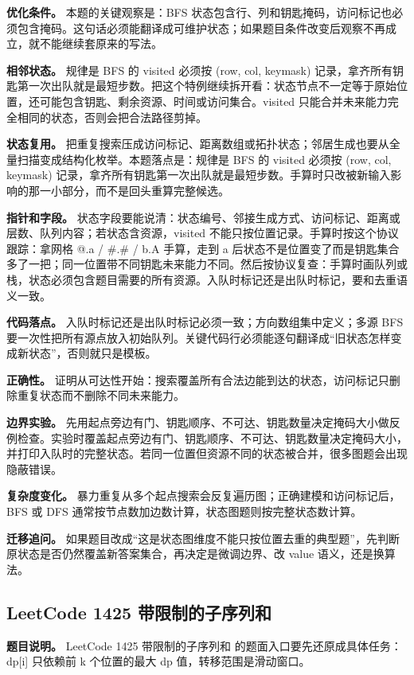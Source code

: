 \textbf{优化条件。} 本题的关键观察是：BFS 状态包含行、列和钥匙掩码，访问标记也必须包含掩码。这句话必须能翻译成可维护状态；如果题目条件改变后观察不再成立，就不能继续套原来的写法。

\textbf{相邻状态。} 规律是 BFS 的 visited 必须按 (row, col, keymask) 记录，拿齐所有钥匙第一次出队就是最短步数。把这个特例继续拆开看：状态节点不一定等于原始位置，还可能包含钥匙、剩余资源、时间或访问集合。visited 只能合并未来能力完全相同的状态，否则会把合法路径剪掉。

\textbf{状态复用。} 把重复搜索压成访问标记、距离数组或拓扑状态；邻居生成也要从全量扫描变成结构化枚举。本题落点是：规律是 BFS 的 visited 必须按 (row, col, keymask) 记录，拿齐所有钥匙第一次出队就是最短步数。手算时只改被新输入影响的那一小部分，而不是回头重算完整候选。

\textbf{指针和字段。} 状态字段要能说清：状态编号、邻接生成方式、访问标记、距离或层数、队列内容；若状态含资源，visited 不能只按位置记录。手算时按这个协议跟踪：拿网格 @.a / \#.\# / b.A 手算，走到 a 后状态不是位置变了而是钥匙集合多了一把；同一位置带不同钥匙未来能力不同。然后按协议复查：手算时画队列或栈，状态必须包含题目需要的所有资源。入队时标记还是出队时标记，要和去重语义一致。

\textbf{代码落点。} 入队时标记还是出队时标记必须一致；方向数组集中定义；多源 BFS 要一次性把所有源点放入初始队列。关键代码行必须能逐句翻译成“旧状态怎样变成新状态”，否则就只是模板。

\textbf{正确性。} 证明从可达性开始：搜索覆盖所有合法边能到达的状态，访问标记只删除重复状态而不删除不同未来能力。

\textbf{边界实验。} 先用起点旁边有门、钥匙顺序、不可达、钥匙数量决定掩码大小做反例检查。实验时覆盖起点旁边有门、钥匙顺序、不可达、钥匙数量决定掩码大小，并打印入队时的完整状态。若同一位置但资源不同的状态被合并，很多图题会出现隐蔽错误。

\textbf{复杂度变化。} 暴力重复从多个起点搜索会反复遍历图；正确建模和访问标记后，BFS 或 DFS 通常按节点数加边数计算，状态图题则按完整状态数计算。

\textbf{迁移追问。} 如果题目改成“这是状态图维度不能只按位置去重的典型题”，先判断原状态是否仍然覆盖新答案集合，再决定是微调边界、改 value 语义，还是换算法。

\subsection{LeetCode 1425 带限制的子序列和}

\textbf{题目说明。} LeetCode 1425 带限制的子序列和 的题面入口要先还原成具体任务：dp[i] 只依赖前 k 个位置的最大 dp 值，转移范围是滑动窗口。


